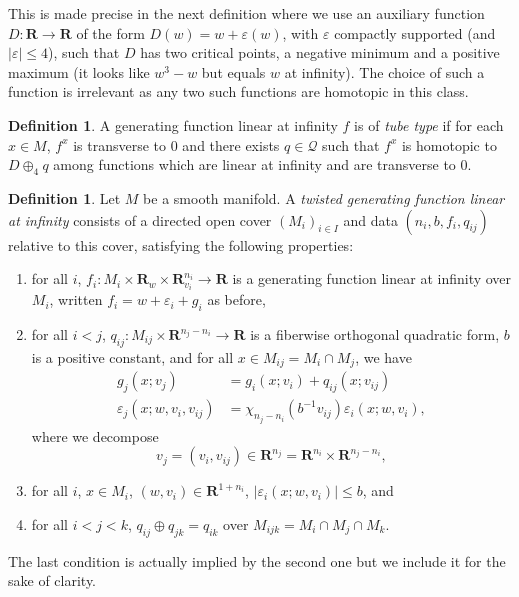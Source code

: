 \documentclass[reqno]{amsart}
\renewcommand{\epsilon}{\varepsilon}
\theoremstyle{theorem}
\theoremstyle{remark}
\theoremstyle{definition}
\newtheorem{definition}[corollary]{Definition}
\newcommand{\R}{\mathbf{R}}
\newcommand{\QQ}{\mathcal{Q}}
\begin{document}
This is made precise in the next definition where we use an auxiliary function $D:\R\to \R$ of the form $D(w)=w+\epsilon(w)$, with $\epsilon$ compactly supported (and $|\epsilon|\leq 4$),
such that $D$ has two critical points, a negative minimum and a positive maximum (it looks like $w^3-w$ but equals $w$ at infinity).
The choice of such a function is irrelevant as any two such functions are homotopic in this class.
\begin{definition}
A generating function linear at infinity $f$ is of \emph{tube type} if for each $x \in M$,
$f^x$ is transverse to $0$ and there exists $q\in \QQ$ such that $f^x$ is homotopic to $D\oplus_4 q$
among functions which are linear at infinity and are transverse to $0$. 
\end{definition}


\begin{definition}
Let $M$ be a smooth manifold. A \emph{twisted generating function linear at infinity} consists of a directed open cover $(M_i)_{i\in I}$ and data $(n_i,b,f_i,q_{ij})$ relative to this cover, satisfying the following properties:
\begin{enumerate}
\item for all $i$, $f_i : M_i\times \R_w \times \R^{n_i}_{v_i}\to \R$ is a generating function linear at infinity over $M_i$, written $f_i=w+\epsilon_i+g_i$ as before,
\item for all $i<j$, $q_{ij}:M_{ij}\times \R^{n_j-n_i}\to \R$ is a fiberwise orthogonal quadratic form, $b$ is a positive constant, and
for all $x \in M_{ij}=M_i\cap M_j$, we have
\begin{align}
g_j(x;v_j) & =g_i(x;v_i) + q_{ij}(x;v_{ij}) \\
  \epsilon_j(x;w,v_i,v_{ij})& =\chi_{n_j-n_i}(b^{-1}v_{ij})\epsilon_i(x;w,v_i),
\end{align}
where we decompose
\begin{equation}
  \label{eq:1}
  v_j=(v_i,v_{ij}) \in \R^{n_j} = \R^{n_i} \times \R^{n_j-n_i},
\end{equation}
\item for all $i$, $x\in M_i$, $(w,v_i)\in \R^{1+n_i}$, $|\epsilon_i(x;w,v_i)|\leq b$, and
\item for all $i<j<k$, $q_{ij}\oplus q_{jk}=q_{ik}$ over $M_{ijk}=M_i\cap M_j \cap M_k$.
\end{enumerate}
\end{definition}


The last condition is actually implied by the second one but we include it for the sake of clarity.
\end{document}
